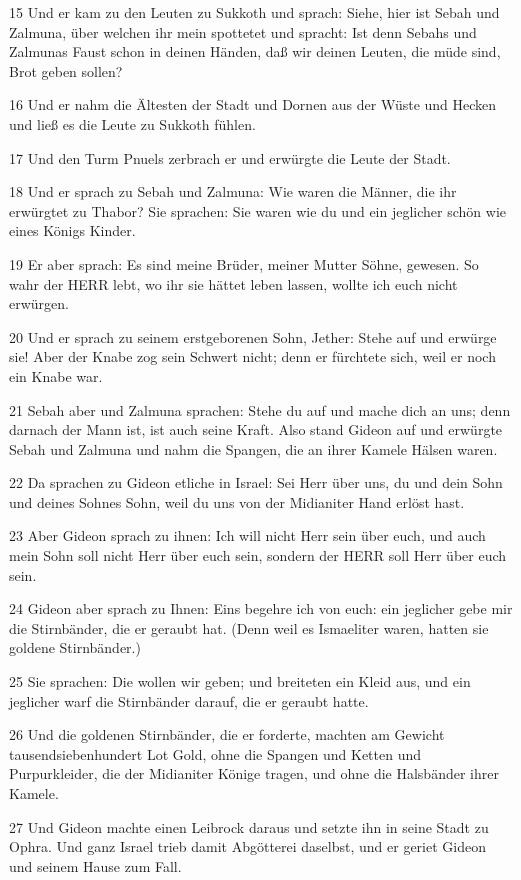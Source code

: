 \par 15 Und er kam zu den Leuten zu Sukkoth und sprach: Siehe, hier ist Sebah und Zalmuna, über welchen ihr mein spottetet und spracht: Ist denn Sebahs und Zalmunas Faust schon in deinen Händen, daß wir deinen Leuten, die müde sind, Brot geben sollen?
\par 16 Und er nahm die Ältesten der Stadt und Dornen aus der Wüste und Hecken und ließ es die Leute zu Sukkoth fühlen.
\par 17 Und den Turm Pnuels zerbrach er und erwürgte die Leute der Stadt.
\par 18 Und er sprach zu Sebah und Zalmuna: Wie waren die Männer, die ihr erwürgtet zu Thabor? Sie sprachen: Sie waren wie du und ein jeglicher schön wie eines Königs Kinder.
\par 19 Er aber sprach: Es sind meine Brüder, meiner Mutter Söhne, gewesen. So wahr der HERR lebt, wo ihr sie hättet leben lassen, wollte ich euch nicht erwürgen.
\par 20 Und er sprach zu seinem erstgeborenen Sohn, Jether: Stehe auf und erwürge sie! Aber der Knabe zog sein Schwert nicht; denn er fürchtete sich, weil er noch ein Knabe war.
\par 21 Sebah aber und Zalmuna sprachen: Stehe du auf und mache dich an uns; denn darnach der Mann ist, ist auch seine Kraft. Also stand Gideon auf und erwürgte Sebah und Zalmuna und nahm die Spangen, die an ihrer Kamele Hälsen waren.
\par 22 Da sprachen zu Gideon etliche in Israel: Sei Herr über uns, du und dein Sohn und deines Sohnes Sohn, weil du uns von der Midianiter Hand erlöst hast.
\par 23 Aber Gideon sprach zu ihnen: Ich will nicht Herr sein über euch, und auch mein Sohn soll nicht Herr über euch sein, sondern der HERR soll Herr über euch sein.
\par 24 Gideon aber sprach zu Ihnen: Eins begehre ich von euch: ein jeglicher gebe mir die Stirnbänder, die er geraubt hat. (Denn weil es Ismaeliter waren, hatten sie goldene Stirnbänder.)
\par 25 Sie sprachen: Die wollen wir geben; und breiteten ein Kleid aus, und ein jeglicher warf die Stirnbänder darauf, die er geraubt hatte.
\par 26 Und die goldenen Stirnbänder, die er forderte, machten am Gewicht tausendsiebenhundert Lot Gold, ohne die Spangen und Ketten und Purpurkleider, die der Midianiter Könige tragen, und ohne die Halsbänder ihrer Kamele.
\par 27 Und Gideon machte einen Leibrock daraus und setzte ihn in seine Stadt zu Ophra. Und ganz Israel trieb damit Abgötterei daselbst, und er geriet Gideon und seinem Hause zum Fall.
